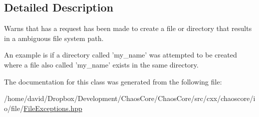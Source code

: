\subsection{Detailed Description}
Warns that has a request has been made to create a file or directory that results in a ambiguous file system path. 

An example is if a directory called 'my\-\_\-name' was attempted to be created where a file also called 'my\-\_\-name' exists in the same directory. 

The documentation for this class was generated from the following file\-:\begin{DoxyCompactItemize}
\item 
/home/david/\-Dropbox/\-Development/\-Chaos\-Core/\-Chaos\-Core/src/cxx/chaoscore/io/file/\hyperlink{_file_exceptions_8hpp}{File\-Exceptions.\-hpp}\end{DoxyCompactItemize}
